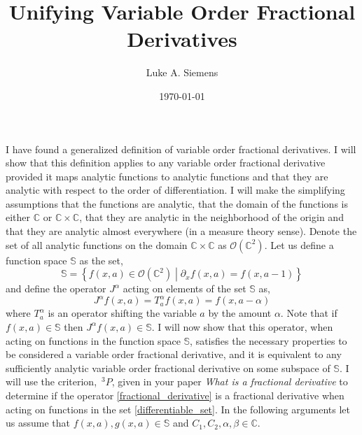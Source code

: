 \documentclass[%
 onecolumn,
 amsmath, amssymb, aps, pra, 10pt
]{revtex4-2}
\begin{document}
\title{Unifying Variable Order Fractional Derivatives}%
\author{Luke A. Siemens}
\noaffiliation
\date{\today}
\maketitle

I have found a generalized definition of variable order fractional derivatives. I will show that this definition applies to any variable order fractional derivative provided it maps analytic functions to analytic functions and that they are analytic with respect to the order of differentiation. I will make the simplifying assumptions that the functions are analytic, that the domain of the functions is either $\mathbb{C}$ or $\mathbb{C} \times \mathbb{C}$, that they are analytic in the neighborhood of the origin and that they are analytic almost everywhere (in a measure theory sense). Denote the set of all analytic functions on the domain $\mathbb{C} \times \mathbb{C}$ as $\mathcal{O}(\mathbb{C}^2)$. Let us define a function space $\mathbb{S}$ as the set,
\begin{equation}
\mathbb{S} = \left\lbrace f(x, a) \in \mathcal{O}(\mathbb{C}^2) \middle| \partial_x f(x, a) = f(x, a - 1) \right\rbrace
\label{differentiable_set}
\end{equation}
and define the operator $J^{\alpha}$ acting on elements of the set $\mathbb{S}$ as,
\begin{equation}
J^{\alpha} f(x, a) = T_{a}^{\alpha} f(x, a) = f(x, a - \alpha)
\label{fractional_derivative}
\end{equation}
where $T_{a}^{\alpha}$ is an operator shifting the variable $a$ by the amount $\alpha$. Note that if $f(x, a) \in \mathbb{S}$ then $J^{\alpha} f(x, a) \in \mathbb{S}$. I will now show that this operator, when acting on functions in the function space $\mathbb{S}$, satisfies the necessary properties to be considered a variable order fractional derivative, and it is equivalent to any sufficiently analytic variable order fractional derivative on some subspace of $\mathbb{S}$.
I will use the criterion, $\,^3P$, given in your paper \textit{What is a fractional derivative} \cite{ORTIGUEIRA20154} to determine if the operator \eqref{fractional_derivative} is a fractional derivative when acting on functions in the set \eqref{differentiable_set}. In the following arguments let us assume that $f(x, a), g(x, a) \in \mathbb{S}$ and $C_1, C_2, \alpha, \beta \in \mathbb{C}$.
\end{document}

